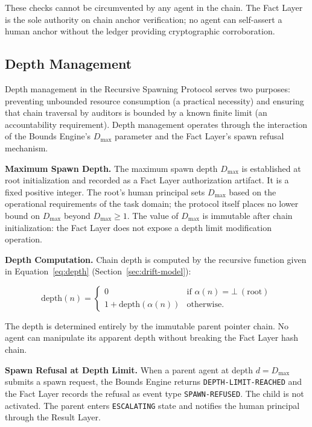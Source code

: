 These checks cannot be circumvented by any agent in the chain. The Fact Layer is the sole authority on chain anchor verification; no agent can self-assert a human anchor without the ledger providing cryptographic corroboration.

\subsection{Depth Management}

Depth management in the Recursive Spawning Protocol serves two purposes: preventing unbounded resource consumption (a practical necessity) and ensuring that chain traversal by auditors is bounded by a known finite limit (an accountability requirement). Depth management operates through the interaction of the Bounds Engine's $D_{\max}$ parameter and the Fact Layer's spawn refusal mechanism.

\medskip
\noindent\textbf{Maximum Spawn Depth.} The maximum spawn depth $D_{\max}$ is established at root initialization and recorded as a Fact Layer authorization artifact. It is a fixed positive integer. The root's human principal sets $D_{\max}$ based on the operational requirements of the task domain; the protocol itself places no lower bound on $D_{\max}$ beyond $D_{\max} \geq 1$. The value of $D_{\max}$ is immutable after chain initialization: the Fact Layer does not expose a depth limit modification operation.

\medskip
\noindent\textbf{Depth Computation.} Chain depth is computed by the recursive function given in Equation~\ref{eq:depth} (Section~\ref{sec:drift-model}):

\begin{equation}
\mathrm{depth}(n) =
\begin{cases}
0 & \text{if }\alpha(n) = \bot\ (\text{root}) \\
1 + \mathrm{depth}(\alpha(n)) & \text{otherwise}.
\end{cases}
\end{equation}

The depth is determined entirely by the immutable parent pointer chain. No agent can manipulate its apparent depth without breaking the Fact Layer hash chain.

\medskip
\noindent\textbf{Spawn Refusal at Depth Limit.} When a parent agent at depth $d = D_{\max}$ submits a spawn request, the Bounds Engine returns \texttt{DEPTH-LIMIT-REACHED} and the Fact Layer records the refusal as event type \texttt{SPAWN-REFUSED}. The child is not activated. The parent enters \texttt{ESCALATING} state and notifies the human principal through the Result Layer.

